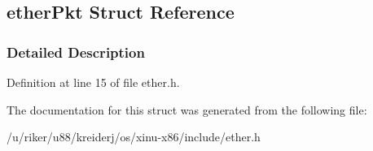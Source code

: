 \hypertarget{structether_pkt}{}\subsection{ether\+Pkt Struct Reference}
\label{structether_pkt}


\subsubsection{Detailed Description}


Definition at line 15 of file ether.\+h.



The documentation for this struct was generated from the following file\+:\begin{DoxyCompactItemize}
\item 
/u/riker/u88/kreiderj/os/xinu-\/x86/include/ether.\+h\end{DoxyCompactItemize}
